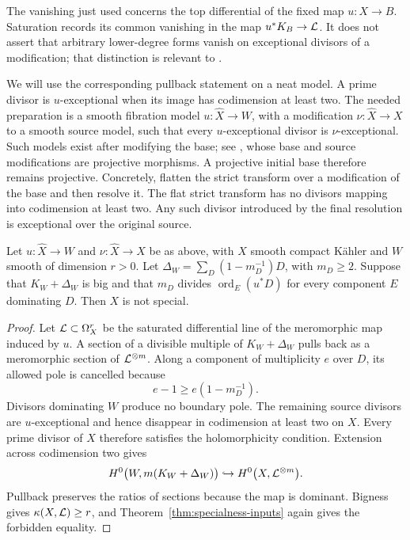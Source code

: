 \begin{remark}\label{de:fixed-map-vanishing}
The vanishing just used concerns the top differential of the fixed map
\(u:X\to B\). Saturation records its common vanishing in the map
\(u^*K_B\to\mathcal L\). It does not assert that arbitrary lower-degree
forms vanish on exceptional divisors of a modification; that distinction
is relevant to \cite[Remark~2.2]{CampanaCorrection}.
\end{remark}

We will use the corresponding pullback statement on a neat model. A
prime divisor is \(u\)-exceptional when its image has codimension at
least two. The needed preparation is a smooth fibration model
\(u:\widehat X\to W\), with a modification
\(\nu:\widehat X\to X\) to a smooth source model, such that every
\(u\)-exceptional divisor is \(\nu\)-exceptional. Such models
exist after modifying the base; see
\cite[Lemma~1.4]{JWang2021}, whose base and source modifications
are projective morphisms. A projective initial base therefore remains
projective.
Concretely, flatten the strict transform over a modification of the
base and then resolve it. The flat strict transform has no divisors
mapping into codimension at least two. Any such divisor introduced by
the final resolution is exceptional over the original source.

\begin{lemma}\label{de:neat-pullback}
Let \(u:\widehat X\to W\) and \(\nu:\widehat X\to X\)
be as above, with \(X\) smooth compact K\"ahler and \(W\) smooth
of dimension \(r>0\). Let
\(\Delta_W=\sum_D(1-m_D^{-1})D\), with \(m_D\ge2\).
Suppose that \(K_W+\Delta_W\) is big and that \(m_D\) divides
\(\operatorname{ord}_E(u^*D)\) for every component \(E\)
dominating \(D\). Then \(X\) is not special.
\end{lemma}

\begin{proof}
Let \(\mathcal L\subset\Omega_X^r\) be the saturated differential
line of the meromorphic map induced by \(u\). A section of a
divisible multiple of \(K_W+\Delta_W\) pulls back as a meromorphic
section of \(\mathcal L^{\otimes m}\). Along a component of multiplicity
\(e\) over \(D\), its allowed pole is cancelled because
\begin{equation}\label{de:differential-cancellation}
 e-1\ge e(1-m_D^{-1}).
\end{equation}
Divisors dominating \(W\) produce no boundary pole. The remaining
source divisors are \(u\)-exceptional and hence disappear in
codimension at least two on \(X\). Every prime divisor of \(X\)
therefore satisfies the holomorphicity condition. Extension across
codimension two gives
\[
 H^0\bigl(W,m(K_W+\Delta_W)\bigr)
 \hookrightarrow H^0\bigl(X,\mathcal L^{\otimes m}\bigr).
\]
Pullback preserves the ratios of sections because the map is dominant.
Bigness gives \(\kappa(X,\mathcal L)\ge r\), and
Theorem~\ref{thm:specialness-inputs} again gives the forbidden equality.
\end{proof}

